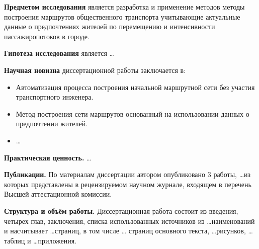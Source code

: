 \textbf{Предметом исследования} является разработка и применение методов методы построения маршрутов 
общественного транспорта учитывающие актуальные данные о предпочтениях жителей по перемещению и 
интенсивности пассажиропотоков в городе.

\textbf{Гипотеза исследования} является \ldots

\textbf{Научная новизна} диссертационной работы заключается в:
\begin{itemize}
    \item Автоматизация процесса построения начальной маршрутной сети без участия транспортного инженера.
    \item Метод построения сети маршрутов основанный на использовании данных о предпочтении жителей.
    \item \ldots
\end{itemize}

\textbf{Практическая ценность.} \ldots

\textbf{Публикации.} По материалам диссертации автором опубликовано 3 работы, \ldots из которых представлены 
в рецензируемом научном журнале, входящем в перечень Высшей аттестационной комиссии. 

\textbf{Структура и объём работы.} Диссертационная работа состоит из введения, четырех глав, заключения, 
списка использованных источников из \ldots наименований и насчитывает \ldots страниц, в том числе \ldots 
страниц основного текста, \ldots рисунков, \ldots таблиц и \ldots приложения.




